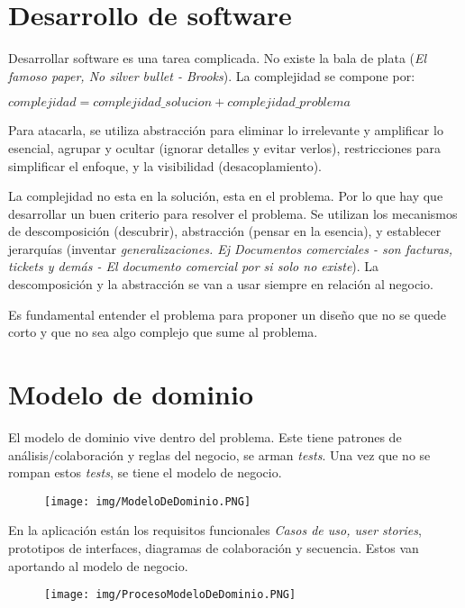 \section{Desarrollo de software}
Desarrollar software es una tarea complicada. No existe la bala de plata (\textit{El famoso paper, No silver bullet - Brooks}). La complejidad se compone por:

\begin{center}
$complejidad = complejidad\_solucion + complejidad\_problema$ 
\end{center}

Para atacarla, se utiliza abstracción para eliminar lo irrelevante y amplificar lo esencial, agrupar y ocultar (ignorar detalles y evitar verlos), restricciones para simplificar el enfoque, y la visibilidad (desacoplamiento).

La complejidad no esta en la solución, esta en el problema. Por lo que hay que desarrollar un buen criterio para resolver el problema. Se utilizan los mecanismos de descomposición (descubrir), abstracción (pensar en la esencia), y establecer jerarquías (inventar \textit{generalizaciones. Ej Documentos comerciales - son facturas, tickets y demás - El documento comercial por si solo no existe}). La descomposición y la abstracción se van a usar siempre en relación al negocio.

Es fundamental entender el problema para proponer un diseño que no se quede corto y que no sea algo complejo que sume al problema. 

\section{Modelo de dominio}
El modelo de dominio vive dentro del problema.  Este tiene patrones de análisis/colaboración y reglas del negocio, se arman \textit{tests}. Una vez que no se rompan estos \textit{tests}, se tiene el modelo de negocio.

\begin{figure}[!htb]
    \centering
    \texttt{[image: img/ModeloDeDominio.PNG]}
\end{figure}

En la aplicación están los requisitos funcionales \textit{Casos de uso, user stories}, prototipos de interfaces, diagramas de colaboración y secuencia. Estos van aportando al modelo de negocio.

\begin{figure}[!htb]
    \centering
    \texttt{[image: img/ProcesoModeloDeDominio.PNG]}
\end{figure}

